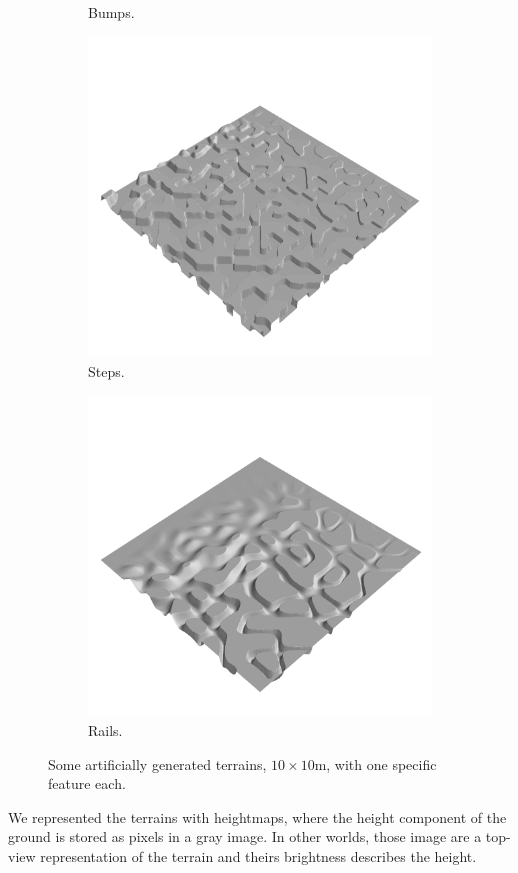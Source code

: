 \documentclass[../document.tex]{subfiles}
\begin{document}
\begin{figure}[htbp]
\begin{subfigure}[b]{0.24\textwidth}
        \caption{Bumps.}
 \end{subfigure}  
    \begin{subfigure}[b]{0.24\textwidth}
        \includegraphics[width=\linewidth]{../img/hm3d/steps1.png}
        \caption{Steps.}
 \end{subfigure}  
    \begin{subfigure}[b]{0.24\textwidth}
        \includegraphics[width=\linewidth]{../img/hm3d/rails3.png}
        \caption{Rails.}
    \end{subfigure}  
\caption{Some artificially generated terrains, $10\times 10$m, with one specific feature each. }   
\label{fig : grounds}
\end{figure}
We represented the terrains with heightmaps, where the height component of the ground is stored as pixels in a gray image. In other worlds, those image are a top-view representation of the terrain and theirs brightness describes the height. 
\end{document}
